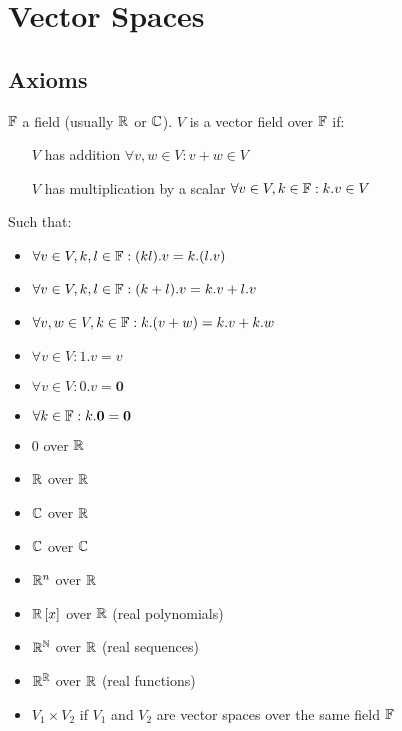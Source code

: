 \chapter{Vector Spaces}
\section{Axioms}
\begin{definition}
	$\mathbb{F}$ a field (usually $\mathbb{R}$ or $\mathbb{C}$).
	$V$ is a vector field over $\mathbb{F}$ if:
	\begin{itemize}
		\item [$V$ has addition] $\forall v,w \in V: v+w \in V$
		\item [$V$ has multiplication by a scalar] $\forall v \in V, k \in \mathbb{F}: k.v \in V$
	\end{itemize}
	Such that:
	\begin{itemize}
		\item $\forall v \in V, k,l \in \mathbb{F}: (kl).v = k.(l.v)$
		\item $\forall v \in V, k,l \in \mathbb{F}: (k+l).v = k.v + l.v$
		\item $\forall v,w \in V, k \in \mathbb{F}: k.(v+w) = k.v + k.w$
		\item $\forall v \in V: 1.v=v$
		\item $\forall v \in V: 0.v=\textbf{0}$
		\item $\forall k \in \mathbb{F}: k.\textbf{0}=\textbf{0}$
	\end{itemize}
\end{definition}
\begin{example}
	\begin{itemize}
		\item $0$ over $\mathbb{R}$
		\item $\mathbb{R}$ over $\mathbb{R}$
		\item $\mathbb{C}$ over $\mathbb{R}$
		\item $\mathbb{C}$ over $\mathbb{C}$
		\item $\mathbb{R}^n$ over $\mathbb{R}$
		\item $\mathbb{R}\left[x\right]$ over $\mathbb{R}$ (real polynomials)
		\item $\mathbb{R}^{\mathbb{N}}$ over $\mathbb{R}$ (real sequences)
		\item $\mathbb{R}^{\mathbb{R}}$ over $\mathbb{R}$ (real functions)
		\item $V_1 \times V_2$ if $V_1$ and $V_2$ are vector spaces over the same field $\mathbb{F}$
	\end{itemize}
\end{example}

